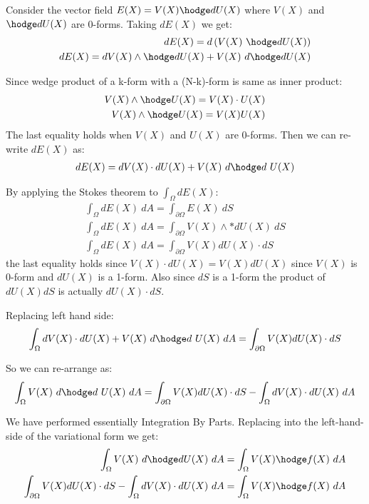 \documentclass{birkjour}
\numberwithin{equation}{section}
\begin{document}
Consider the vector field $E(X) = V(X) \hodge d U(X)$ where $V(X)$ and $ \hodge d U(X)$ are 0-forms. Taking $d E(X)$ we get:
\begin{eqnarray} 
	d E(X) = d \left( V(X) \ \hodge dU(X) \right) \nonumber\\
	d E(X) = d V(X) \wedge \hodge d U(X) + V(X) \ d \hodge d U(X) \nonumber
\end{eqnarray} 

Since wedge product of a k-form with a (N-k)-form is same as inner product:
\begin{eqnarray} 
	V(X) \wedge \hodge U(X) = V(X) \cdot U(X) \nonumber\\
	V(X) \wedge \hodge U(X) = V(X) U(X) \nonumber
\end{eqnarray}
The last equality holds when $V(X)$ and $U(X)$ are 0-forms. Then we can re-write $d E(X)$ as:
\begin{eqnarray} 
	d E(X)  = dV(X) \cdot dU(X) + V(X) \ d \hodge d \ U(X) \nonumber
\end{eqnarray} 

By applying the Stokes theorem to $\int_{\Omega} d E(X)$:
\begin{eqnarray} 
\int_{\Omega}{ d E(X) \ dA } = \int_{\partial \Omega} { E(X) \ dS }   \nonumber\\
\int_{\Omega}{ d E(X) \ dA } = \int_{\partial \Omega} { V(X) \wedge *dU(X) \ dS } \nonumber\\
\int_{\Omega}{ d E(X) \ dA } = \int_{\partial \Omega} { V(X) dU(X) \cdot dS } \nonumber
\end{eqnarray} 
the last equality holds since $V(X) \cdot dU(X) = V(X) dU(X)$ since $V(X)$ is 0-form and $dU(X)$ is a 1-form. Also
since $dS$ is a 1-form the product of $dU(X) dS$ is actually $dU(X) \cdot dS$.

Replacing left hand side:
\begin{eqnarray} 
	\int_{\Omega}{dV(X) \cdot dU(X) + V(X) \ d \hodge d \ U(X) \ dA} = \int_{\partial \Omega} { V(X) dU(X) \cdot dS }
\end{eqnarray}

So we can re-arrange as:
\begin{eqnarray} 
\int_{\Omega} {V(X) \ d \hodge d \ U(X) \ dA} = \int_{\partial \Omega} {V(X) dU(X) \cdot dS} - \int_{\Omega} {dV(X) \cdot dU(X) \ dA}
\end{eqnarray}

We have performed essentially Integration By Parts. Replacing into the left-hand-side 
of the variational form we get:
\begin{eqnarray} 
\int_{\Omega} { V(X) \ d \hodge d U(X) \ dA } = \int_{\Omega} { V(X) \hodge f(X) \ dA } \nonumber\\
\int_{\partial \Omega} { V(X) dU(X) \cdot dS } - \int_{\Omega} {dV(X) \cdot dU(X) \ dA} = \int_{\Omega} { V(X) \hodge f(X) \ dA } \nonumber
\end{eqnarray}
 
\end{document}
